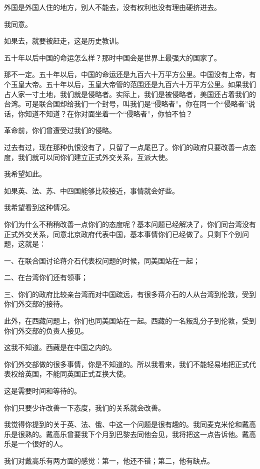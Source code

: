 外国是外国人住的地方，别人不能去，没有权利也没有理由硬挤进去。

我同意。

如果去，就要被赶走，这是历史教训。

五十年以后中国的命运怎么样？那时中国会是世界上最强大的国家了。

那不一定。五十年以后，中国的命运还是九百六十万平方公里。中国没有上帝，有个玉皇大帝。五十年以后，玉皇大帝管的范围还是九百六十万平方公里。如果我们占人家一寸土地，我们就是侵略者。实际上，我们是被侵略者，美国还占着我们的台湾。可是联合国却给我们一个封号，叫我们是“侵略者”。你在同一个“侵略者”说话，你知道不知道？在你对面坐着一个“侵略者”，你怕不怕？

革命前，你们曾遭受过我们的侵略。

过去有过，现在那种仇恨没有了，只留了一点尾巴了。你们的政府只要改善一点态度，我们就可以同你们建立正式外交关系，互派大使。

我希望如此。

如果英、法、苏、中四国能够比较接近，事情就会好些。

我希望看到这种情况。

你们为什么不稍稍改善一点你们的态度呢？基本问题已经解决了，你们同台湾没有正式外交关系，同意北京政府代表中国，基本事情你们已经做了。只剩下个别问题，这就是：

一、在联合国讨论蒋介石代表权问题的时候，同美国站在一起；

二、在台湾你们还有领事；

三、你们的政府比较亲台湾而对中国疏远，有很多蒋介石的人从台湾到伦敦，受到你们外交部的接待。

此外，在西藏问题上，你们也同美国站在一起。西藏的一名叛乱分子到伦敦，受到你们外交部的负责人接见。

这我不知道。西藏是在中国之内的。

你们外交部做的很多事情，你是不知道的。所以我看来，我们不能轻易地把正式代表权给英国，不能同英国正式互换大使。

这是需要时间和等待的。

你们只要少许改善一下态度，我们的关系就会改善。

我觉得你提到的关于英、法、俄、中这一个问题是很有趣的。我同麦克米伦和戴高乐是很熟的。戴高乐曾要我下个月到巴黎去同他会见，我将把这一点告诉他。戴高乐是一个很好的人。

我们对戴高乐有两方面的感觉：第一，他还不错；第二，他有缺点。

